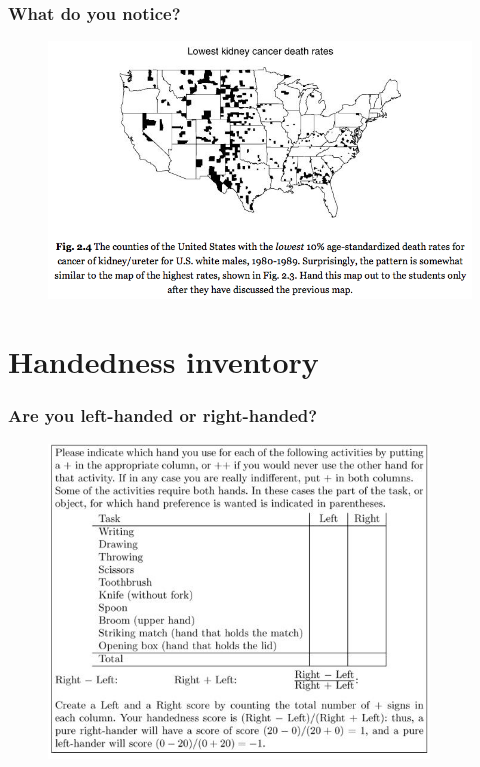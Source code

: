 \documentclass[compress,handout,10pt]{beamer}
\begin{document}
\begin{frame}
    \frametitle{What do you notice?}
    \vspace{7pt}
    \begin{figure}
        \begin{center}
            \includegraphics[width=\textwidth]{images/LowestKidneyCancerDeathRate.png}
        \end{center}
    \end{figure}
\end{frame}

\section{Handedness inventory}
\begin{frame}
    \frametitle{Are you left-handed or right-handed?}
    \vspace{7pt}
    \begin{figure}
        \begin{center}
            \includegraphics[width=0.9\textwidth]{images/HandednessInventory.png}
        \end{center}
    \end{figure}
\end{frame}
\end{document}
